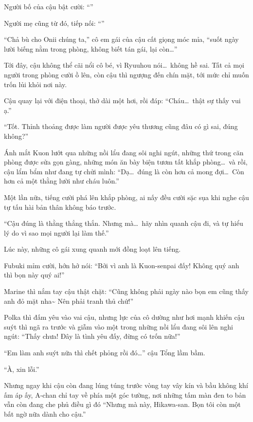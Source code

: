 \documentclass[../main.tex]{subfiles}
\begin{document}
Người bố của cậu bật cười: ``''

Người mẹ cũng từ đó, tiếp nối: ``''

``Chả bù cho Onii chúng ta,'' cô em gái của cậu cất giọng móc mỉa, ``suốt ngày lười biếng nằm trong phòng, không biết tán gái, lại còn\dots''

Tới đây, cậu không thể cãi nổi cô bé, vì Ryuuhou nói\dots\ không hề sai. Tất cả mọi người trong phòng cười ồ lên, còn cậu thì ngượng đến chín mặt, tới mức chỉ muốn trốn lủi khỏi nơi này.

Cậu quay lại với điện thoại, thở dài một hơi, rồi đáp: ``Cháu\dots\ thật sự thấy vui ạ.''

``Tốt. Thỉnh thoảng được làm người được yêu thương cũng đâu có gì sai, đúng không?''

Ánh mắt Kuon lướt qua những nồi lẩu đang sôi nghi ngút, những thứ trong căn phòng được sửa gọn gàng, những món ăn bày biện tươm tất khắp phòng\dots\ và rồi, cậu lẩm bẩm như đang tự chửi mình: ``Dạ\dots\ đúng là còn hơn cả mong đợi\dots\ Còn hơn cả một thằng lười như cháu luôn.''

Một lần nữa, tiếng cười phá lên khắp phòng, ai nấy đều cười sặc sụa khi nghe cậu tự tấu hài bản thân không báo trước.

``Cậu đúng là thằng thẳng thắn. Nhưng mà\dots\ hãy nhìn quanh cậu đi, và tự hiểu lý do vì sao mọi người lại làm thế.''

Lúc này, những cô gái xung quanh mới đồng loạt lên tiếng.

Fubuki mỉm cười, hớn hở nói: ``Bởi vì anh là Kuon-senpai đấy! Không quý anh thì bọn này quý ai!''

Marine thì nắm tay cậu thật chặt: ``Cũng không phải ngày nào bọn em cũng thấy anh đỏ mặt nha\~{} Nên phải tranh thủ chứ!''

Polka thì đấm yêu vào vai cậu, nhưng lực của cô dường như hơi mạnh khiến cậu suýt thì ngã ra trước và giẫm vào một trong những nồi lẩu đang sôi lên nghi ngút: ``Thấy chưa! Đây là tình yêu đấy, đừng có trốn nữa!''

``Em làm anh suýt nữa thì chết phỏng rồi đó\dots'' cậu Tổng lầm bầm.

``À, xin lỗi.''

Nhưng ngay khi cậu còn đang lúng túng trước vòng tay vây kín và bầu không khí ấm áp ấy, A-chan chỉ tay về phía một góc tường, nơi những tấm màn đen to bản vẫn còn đang che phủ điều gì đó ``Nhưng mà này, Hikawa-san. Bọn tôi còn một bất ngờ nữa dành cho cậu.''
\end{document}

